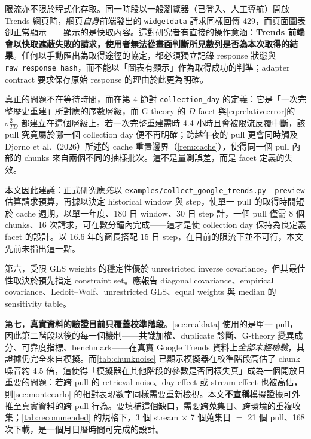 \documentclass[12pt,a4paper,oneside]{article}
\begin{document}
限流亦不限於程式化存取。同一時段以一般瀏覽器（已登入、人工導航）開啟 Trends 網頁時，網頁\emph{自身}前端發出的 \texttt{widgetdata} 請求同樣回傳 429，而頁面圖表卻正常顯示——顯示的是快取內容。這對研究者有直接的操作意涵：\textbf{Trends 前端會以快取遮蔽失敗的請求，使用者無法從畫面判斷所見數列是否為本次取得的結果}。任何以手動匯出為取得途徑的協定，都必須獨立記錄 response 狀態與 \texttt{raw\_response\_hash}，而不能以「圖表有顯示」作為取得成功的判準；adapter contract 要求保存原始 response 的理由於此更為明確。

真正的問題不在等待時間，而在第 4 節對 \texttt{collection\_day} 的定義：它是「一次完整歷史重建」所對應的序數層級，而 G-theory 的 $D$ facet 與\cref{eq:relativeerror}的 $\sigma_{TD}^2$ 都建立在這個層級上。若一次完整重建需時 4.4 小時且會被限流反覆中斷，該 pull 究竟屬於哪一個 collection day 便不再明確；跨越午夜的 pull 更會同時觸及 Djorno et al.（2026）所述的 cache 重置邊界（\cref{rem:cache}），使得同一個 pull 內部的 chunks 來自兩個不同的抽樣批次。這不是量測誤差，而是 facet 定義的失效。

本文因此建議：正式研究應\emph{先}以 \texttt{examples/collect\_google\_trends.py --preview} 估算請求預算，再據以決定 historical window 與 step，使單一 pull 的取得時間短於 cache 週期。以單一年度、180 日 window、30 日 step 計，一個 pull 僅需 8 個 chunks、16 次請求，可在數分鐘內完成——這才是使 collection day 保持為良定義 facet 的設計。以 16.6 年的窗長搭配 15 日 step，在目前的限流下並不可行，本文先前未指出這一點。

第六，受限 GLS weights 的穩定性優於 unrestricted inverse covariance，但其最佳性取決於預先指定 constraint set。應報告 diagonal covariance、empirical covariance、Ledoit--Wolf、unrestricted GLS、equal weights 與 median 的 sensitivity table。

第七，\textbf{真實資料的驗證目前只覆蓋校準階段}。\cref{sec:realdata} 使用的是單一 pull，因此第二階段以後的每一個機制——共識加權、duplicate 診斷、G-theory 變異成分、可靠度指標、benchmark——在真實 Google Trends 資料上\emph{全部未經檢驗}，其證據仍完全來自模擬。而\cref{tab:chunknoise} 已顯示模擬器在校準階段高估了 chunk 噪音約 4.5 倍，這使得「模擬器在其他階段的參數是否同樣失真」成為一個開放且重要的問題：若跨 pull 的 retrieval noise、day effect 或 stream effect 也被高估，則\cref{sec:montecarlo} 的相對表現數字同樣需要重新檢視。本文\textbf{不宣稱}模擬證據可外推至真實資料的跨 pull 行為。要填補這個缺口，需要跨蒐集日、跨環境的重複收集；\cref{tab:recommended} 的規格下，3 個 stream $\times$ 7 個蒐集日 $=$ 21 個 pull、168 次下載，是一個月日曆時間可完成的設計。
\end{document}

